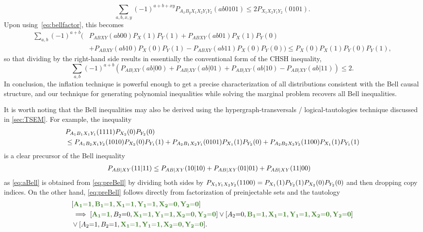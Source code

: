{\[
	\sum_{a,b,x,y} (-1)^{a + b + xy} P_{A_x B_y X_1 X_2 Y_1 Y_2}(a b 0 1 0 1) \leq 2 P_{X_1 X_2 Y_1 Y_2}(0101).
\]
Upon using~\cref{eq:bellfactor}, this becomes
\begin{align*}
	\sum_{a,b} (-1)^{a + b} \big( & P_{A B X Y}(ab00)P_X(1)P_Y(1) + P_{A B X Y}(ab01)P_X(1)P_Y(0) \\
	& + P_{A B X Y}(ab10)P_X(0)P_Y(1) - P_{A B X Y}(ab11)P_X(0)P_Y(0) \big) \leq P_X(0)P_X(1)P_Y(0)P_Y(1),
\end{align*}
so that dividing by the right-hand side results in essentially the conventional form of the CHSH inequality,
\[
	\sum_{a,b} (-1)^{a + b} \left( P_{AB|XY}(ab|00) + P_{AB|XY}(ab|01) + P_{AB|XY}(ab|10) - P_{AB|XY}(ab|11) \right) \leq 2.
\]
In conclusion, the inflation technique is powerful enough to get a precise characterization of all distributions consistent with the Bell causal structure, and our technique for generating polynomial inequalities while solving the marginal problem recovers all Bell inequalities.

It is worth noting that the Bell inequalities may also be derived using the hypergraph-transversals / logical-tautologies technique discussed in \cref{sec:TSEM}. For example, the inequality
\begin{align}\label{eq:preBell}\begin{split}
& \p[A_1 B_1 X_1 Y_1]{1111}\p[X_2]{0} \p[Y_2]{0} \\
&\leq
 \p[A_1 B_2 X_1 Y_2]{1010}\p[X_2]{0} \p[Y_1]{1} +\p[A_2 B_1 X_2 Y_1]{0101}\p[X_1]{1}\p[Y_2]{0}+  \p[A_2 B_2 X_2 Y_2]{1100}\p[X_1]{1} \p[Y_1]{1}
\end{split}\end{align}
is a clear precursor of the Bell inequality
\begin{align}\label{eq:aBell}
 \p[A B | X Y]{11|11} &\leq \p[A B | X Y]{10|10} +\p[A B | X Y]{01|01}+  \p[A B | X Y]{11|00}
\end{align}
as \cref{eq:aBell} is obtained from \cref{eq:preBell} by dividing both sides by $\p[X_1 Y_1 X_2 Y_2]{1100}=\p[X_1]{1} \p[Y_2]{1}\p[X_2]{0} \p[Y_2]{0}$ and then dropping copy indices. On the other hand, \cref{eq:preBell} follows directly from factorization of preinjectable sets and the tautology
\begin{align}\begin{split}
&[ \mgreen{A_1 \eql 1}, \mgreen{B_1 \eql 1}, \mgreen{X_1 \eql 1}, \mgreen{Y_1\eql 1}, \mgreen{X_2 \eql 0}, \mgreen{Y_2 \eql 0}]\\
 & \implies 
 [ \mgreen{A_1 \eql 1}, B_2 \eql 0, \mgreen{X_1 \eql 1}, \mgreen{Y_1\eql 1}, \mgreen{X_2 \eql 0}, \mgreen{Y_2 \eql 0}]
\lor [ A_2 \eql 0, \mgreen{B_1 \eql 1}, \mgreen{X_1 \eql 1}, \mgreen{Y_1\eql 1}, \mgreen{X_2 \eql 0}, \mgreen{Y_2 \eql 0}] \\&\lor [ A_2 \eql 1, B_2 \eql 1, \mgreen{X_1 \eql 1}, \mgreen{Y_1\eql 1}, \mgreen{X_2 \eql 0}, \mgreen{Y_2 \eql 0}].
\end{split}\end{align}

}
